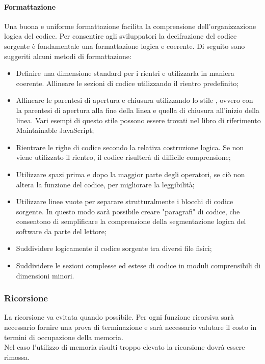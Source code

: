 \documentclass[../NormeDiProgetto.tex]{subfiles}
\begin{document}
                  \paragraph{Formattazione}
                  Una buona e uniforme formattazione facilita la comprensione dell'organizzazione logica del codice. Per consentire agli sviluppatori la decifrazione del codice sorgente è fondamentale una formattazione logica e coerente.
                  Di seguito sono suggeriti alcuni metodi di formattazione:
                  \begin{itemize}
                        \item Definire una dimensione standard per i rientri e utilizzarla in maniera coerente. Allineare le sezioni di codice utilizzando il rientro predefinito;
                        \item Allineare le parentesi di apertura e chiusura utilizzando lo stile , ovvero con la parentesi di apertura alla fine della linea e quella di chiusura all'inizio della linea. Vari esempi di questo stile possono essere trovati nel libro di riferimento Maintainable JavaScript;
                        \item Rientrare le righe di codice secondo la relativa costruzione logica. Se non viene utilizzato il rientro, il codice risulterà di difficile comprensione;
                        \item Utilizzare spazi prima e dopo la maggior parte degli operatori, se ciò non altera la funzione del codice, per migliorare la leggibilità;
                        \item Utilizzare linee vuote per separare strutturalmente i blocchi di codice sorgente. In questo modo sarà possibile creare "paragrafi" di codice, che consentono di semplificare la comprensione della segmentazione logica del software da parte del lettore;
                        \item Suddividere logicamente il codice sorgente tra diversi file fisici;
                        \item Suddividere le sezioni complesse ed estese di codice in moduli comprensibili di dimensioni minori.
                  \end{itemize}

            \subsubsection{Ricorsione}
            La ricorsione va evitata quando possibile. Per ogni funzione ricorsiva sarà necessario fornire una prova di terminazione e sarà necessario valutare il costo in termini di occupazione della memoria. \\
            Nel caso l'utilizzo di memoria risulti troppo elevato la ricorsione dovrà essere rimossa.
\end{document}
